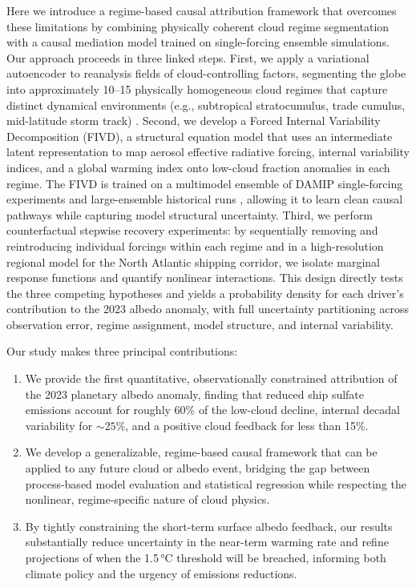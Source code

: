 \documentclass{article}
\begin{document}
Here we introduce a regime-based causal attribution framework that overcomes these limitations by combining physically coherent cloud regime segmentation with a causal mediation model trained on single-forcing ensemble simulations. Our approach proceeds in three linked steps. First, we apply a variational autoencoder to reanalysis fields of cloud-controlling factors, segmenting the globe into approximately 10–15 physically homogeneous cloud regimes that capture distinct dynamical environments (e.g., subtropical stratocumulus, trade cumulus, mid-latitude storm track) \cite{oreopoulos2016regimes, tselioudis2013regimes}. Second, we develop a Forced Internal Variability Decomposition (FIVD), a structural equation model that uses an intermediate latent representation to map aerosol effective radiative forcing, internal variability indices, and a global warming index onto low-cloud fraction anomalies in each regime. The FIVD is trained on a multimodel ensemble of DAMIP single-forcing experiments and large-ensemble historical runs \cite{maher2019max, kay2015community}, allowing it to learn clean causal pathways while capturing model structural uncertainty. Third, we perform counterfactual stepwise recovery experiments: by sequentially removing and reintroducing individual forcings within each regime and in a high-resolution regional model for the North Atlantic shipping corridor, we isolate marginal response functions and quantify nonlinear interactions. This design directly tests the three competing hypotheses and yields a probability density for each driver's contribution to the 2023 albedo anomaly, with full uncertainty partitioning across observation error, regime assignment, model structure, and internal variability.

Our study makes three principal contributions:
\begin{enumerate}
    \item We provide the first quantitative, observationally constrained attribution of the 2023 planetary albedo anomaly, finding that reduced ship sulfate emissions account for roughly 60\% of the low-cloud decline, internal decadal variability for ${\sim}25\%$, and a positive cloud feedback for less than 15\%.
    \item We develop a generalizable, regime-based causal framework that can be applied to any future cloud or albedo event, bridging the gap between process-based model evaluation and statistical regression while respecting the nonlinear, regime-specific nature of cloud physics.
    \item By tightly constraining the short-term surface albedo feedback, our results substantially reduce uncertainty in the near-term warming rate and refine projections of when the 1.5\,°C threshold will be breached, informing both climate policy and the urgency of emissions reductions.
\end{enumerate}
\end{document}

